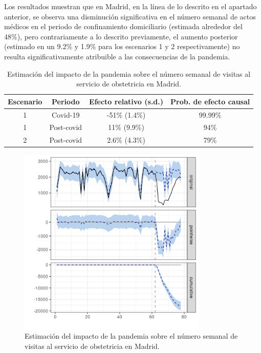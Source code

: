 \documentclass[12pt,twoside]{article} %
\begin{document}
Los resultados muestran que en Madrid, en la línea de lo descrito en el apartado anterior, se observa una disminución significativa en el número semanal de actos médicos en el periodo de confinamiento domiciliario (estimada alrededor del 48\%), pero contrariamente a lo descrito previamente, el aumento posterior (estimado en un 9.2\% y 1.9\% para los escenarios 1 y 2 respectivamente) no resulta significativamente atribuible a las consecuencias de la pandemia.      
\begin{table}[H]\caption{Estimación del impacto de la pandemia sobre el número semanal de visitas al servicio de obstetricia en Madrid.}
    \centering
      \begin{tabular}{ |c|c|c|c| }
        \hline
        \textbf{Escenario} & \textbf{Periodo} & \textbf{Efecto relativo (s.d.)} & \textbf{Prob. de efecto causal} \\ 
        \hline
     1 & Covid-19 & -51\% (1.4\%) & 99.99\% \\  
     1 & Post-covid & 11\% (9.9\%) & 94\% \\
     \hline   
     2 & Post-covid & 2.6\% (4.3\%) & 79\% \\
     \hline
    \end{tabular}
  \end{table}
  
  \begin{center}
    \begin{figure}[H]
      \includegraphics[width=9cm]{obstetrics_covid_Madrid.png}\caption{Estimación del impacto de la pandemia sobre el número semanal de visitas al servicio de obstetricia en Madrid.}
    \end{figure}
    \end{center}
    
\end{document}

